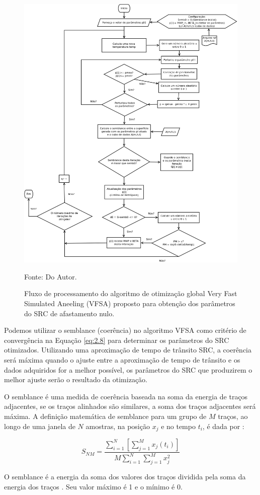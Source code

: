 \begin{figure}[htb]
\caption{Fluxo de processamento do algoritmo de otimização global Very Fast Simulated Aneeling (VFSA)
proposto para obtenção dos parâmetros do SRC de afastamento nulo.}
\begin{center}
\includegraphics[scale=0.45]{images/VFSA.png}
\vspace{-0.3cm}
\end{center}
\begin{center}
 Fonte: Do Autor.
\end{center}
\label{fig:2.1}
\end{figure}

Podemos utilizar o semblance (coerência) no algoritmo VFSA como critério de convergência na Equação \ref{eq:2.8}
para determinar os parâmetros do SRC otimizados. Utilizando uma aproximação de tempo de trânsito SRC,
a coerência será máxima quando o ajuste entre a aproximação de tempo de trânsito e os dados adquiridos
for a melhor possível, os parâmetros do SRC que produzirem o melhor ajuste serão o resultado da otimização.

O semblance é uma medida de coerência baseada na soma da energia de traços adjacentes, se os traços alinhados são similares,
a soma dos traços adjacentes será máxima. A definição matemática de semblance para um grupo de $M$ traços, ao 
longo de uma janela de $N$ amostras, na posição $x_j$ e no tempo $t_i$, é dada por \cite{seg}:

\begin{equation}
\label{eq:2.17}
 S_{NM}=\frac{ \sum_{i=1}^N [\sum_{j=1}^M x_j(t_i)]}{M \sum_{i=1}^N \sum_{j=1}^Mx^2_{j}}
\end{equation}

O semblance é a energia da soma dos valores dos traços dividida pela soma da energia dos traços \cite{seg}. 
Seu valor máximo é 1 e o mínimo é 0.


